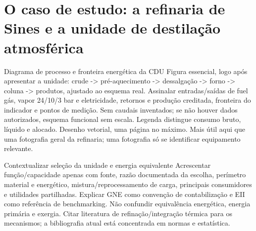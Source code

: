 

\section{O caso de estudo: a refinaria de Sines e a unidade de destilação atmosférica}
\label{sec:caso-estudo}
{Diagrama de processo e fronteira energética da CDU}
{Figura essencial, logo após apresentar a unidade: crude -\textgreater{} pré-aquecimento
-\textgreater{} dessalgação -\textgreater{} forno -\textgreater{} coluna -\textgreater{} produtos, ajustado ao esquema real.
Assinalar entradas/saídas de fuel gás, vapor 24/10/3 bar e eletricidade,
retornos e produção creditada, fronteira do indicador e pontos de medição.
Sem caudais inventados; se não houver dados autorizados, esquema funcional
sem escala. Legenda distingue consumo bruto, líquido e alocado. Desenho
vetorial, uma página no máximo. Mais útil aqui que uma fotografia geral
da refinaria; uma fotografia só se identificar equipamento relevante.}%

{Contextualizar seleção da unidade e energia equivalente}
{Acrescentar função/capacidade apenas com fonte, razão documentada da escolha,
perímetro material e energético, mistura/reprocessamento de carga,
principais consumidores e utilidades partilhadas. Explicar GNE como
convenção de contabilização e EII como referência de benchmarking.
Não confundir equivalência energética, energia primária e exergia.
Citar literatura de refinação/integração térmica para os mecanismos;
a bibliografia atual está concentrada em normas e estatística.}%
